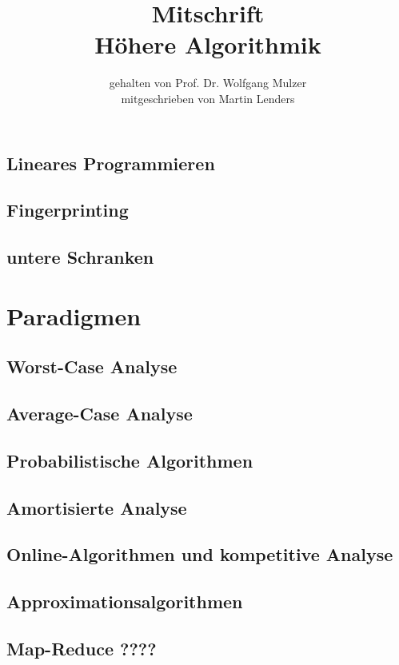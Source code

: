 \documentclass[a4paper,10pt]{scrbook}
\title{Mitschrift\\{\LARGE Höhere Algorithmik}}
\author{gehalten von Prof. Dr. Wolfgang Mulzer \\ mitgeschrieben von Martin Lenders}
\begin{document}
\maketitle
\tableofcontents



















\section{Lineares Programmieren}
\section{Fingerprinting}
\section{untere Schranken}
\chapter{Paradigmen}
\section{Worst-Case Analyse}
\section{Average-Case Analyse}
\section{Probabilistische Algorithmen}
\section{Amortisierte Analyse}
\section{Online-Algorithmen und kompetitive Analyse}
\section{Approximationsalgorithmen}
\section{Map-Reduce ????}
\end{document}
